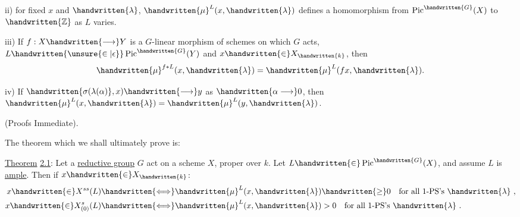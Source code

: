 ii) for fixed $x$ and $\handwritten{\lambda}$, $\handwritten{\mu}^{L}(x,\handwritten{\lambda})$ defines a homomorphism from $\operatorname{Pic}^{\handwritten{G}}(X)$ to $\handwritten{\mathbb{Z}}$ as $L$ varies.

iii) If $f:X\handwritten{\longrightarrow}Y$ is a $G$-linear morphism of schemes on which $G$ acts, $L\handwritten{\unsure{\in|\epsilon}}\operatorname{Pic}^{\handwritten{G}}(Y)$ and $x\handwritten{\in}X_{\handwritten{k}}$, then
\[
\handwritten{\mu}^{f*L}(x,\handwritten{\lambda})=\handwritten{\mu}^{L}(fx,\handwritten{\lambda}).
\]

iv) If $\handwritten{\sigma(\lambda(\alpha)},x)\handwritten{\longrightarrow}y$ as $\handwritten{\alpha\longrightarrow}0$, then $\handwritten{\mu}^{L}(x,\handwritten{\lambda})=\handwritten{\mu}^{L}(y,\handwritten{\lambda})$.

(Proofs Immediate).

The theorem which we shall ultimately prove is:

\uline{Theorem} \uline{2.1}: Let a \uline{reductive group} $G$ act on a scheme $X$, proper over $k$. Let $L\handwritten{\in}\operatorname{Pic}^{\handwritten{G}}(X)$, and assume $L$ is \uline{ample}. Then if $x\handwritten{\in}X_{\handwritten{k}}$:
\[
\begin{aligned}
x\handwritten{\in}X^{ss}(L)&\handwritten{\Longleftrightarrow}\handwritten{\mu}^{L}(x,\handwritten{\lambda})\handwritten{\geq}0\quad\text{for all 1-PS's }\handwritten{\lambda}\ ,\\
x\handwritten{\in}X^{s}_{(0)}(L)&\handwritten{\Longleftrightarrow}\handwritten{\mu}^{L}(x,\handwritten{\lambda})>0\quad\text{for all 1-PS's }\handwritten{\lambda}\ .
\end{aligned}
\]

